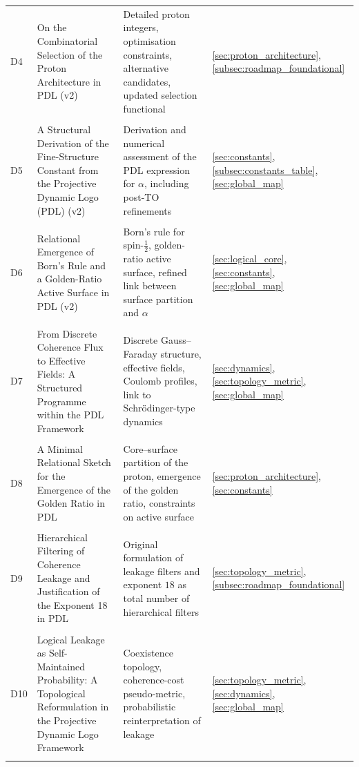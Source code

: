 \documentclass[11pt,a4paper]{article}
\begin{document}
\begin{longtable}{@{}p{0.9cm}L{5cm}L{6.5cm}L{2.4cm}@{}}
  D4 &
  On the Combinatorial Selection of the Proton Architecture in PDL (v2) &
  Detailed proton integers, optimisation constraints, alternative candidates, updated selection functional &
  \ref{sec:proton_architecture}, \ref{subsec:roadmap_foundational} \\\\[0.4em]

  D5 &
  A Structural Derivation of the Fine-Structure Constant from the Projective Dynamic Logo (PDL) (v2) &
  Derivation and numerical assessment of the PDL expression for $\alpha$, including post-TO refinements &
  \ref{sec:constants}, \ref{subsec:constants_table}, \ref{sec:global_map} \\\\[0.4em]

  D6 &
  Relational Emergence of Born's Rule and a Golden-Ratio Active Surface in PDL (v2) &
  Born's rule for spin-$\tfrac{1}{2}$, golden-ratio active surface, refined link between surface partition and $\alpha$ &
  \ref{sec:logical_core}, \ref{sec:constants}, \ref{sec:global_map} \\\\[0.4em]

  D7 &
  From Discrete Coherence Flux to Effective Fields: A Structured Programme within the PDL Framework &
  Discrete Gauss–Faraday structure, effective fields, Coulomb profiles, link to Schr\"odinger-type dynamics &
  \ref{sec:dynamics}, \ref{sec:topology_metric}, \ref{sec:global_map} \\\\[0.4em]

  D8 &
  A Minimal Relational Sketch for the Emergence of the Golden Ratio in PDL &
  Core–surface partition of the proton, emergence of the golden ratio, constraints on active surface &
  \ref{sec:proton_architecture}, \ref{sec:constants} \\\\[0.4em]

  D9 &
  Hierarchical Filtering of Coherence Leakage and Justification of the Exponent 18 in PDL &
  Original formulation of leakage filters and exponent $18$ as total number of hierarchical filters &
  \ref{sec:topology_metric}, \ref{subsec:roadmap_foundational} \\\\[0.4em]

  D10 &
  Logical Leakage as Self-Maintained Probability: A Topological Reformulation in the Projective Dynamic Logo Framework &
  Coexistence topology, coherence-cost pseudo-metric, probabilistic reinterpretation of leakage &
  \ref{sec:topology_metric}, \ref{sec:dynamics}, \ref{sec:global_map} \\\\[0.4em]


\end{longtable}
\end{document}
